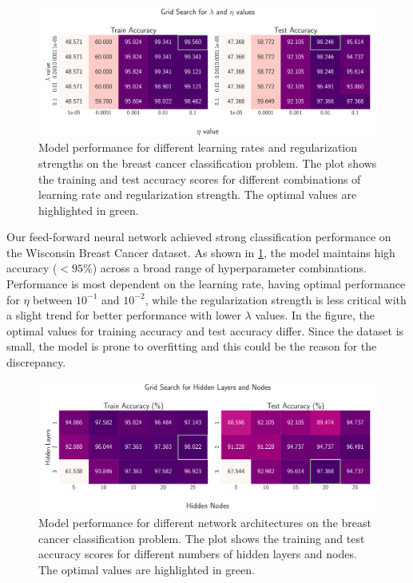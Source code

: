 \onecolumngrid
\begin{figure}[ht!]
    \centering
    \includegraphics[width = .9\textwidth]{../figs/classification_lambda_eta.pdf}
    \caption{Model performance for different learning rates and regularization strengths on the breast cancer classification problem. The plot shows the training and test accuracy scores for different combinations of learning rate and regularization strength. The optimal values are highlighted in green.}
    \label{fig:NN_Classification_lambda_eta}
\end{figure}
\twocolumngrid

Our feed-forward neural network achieved strong classification performance on the Wisconsin Breast Cancer dataset. As shown in \cref{fig:NN_Classification_lambda_eta}, the model maintains high accuracy ($<95\%$) across a broad range of hyperparameter combinations. Performance is most dependent on the learning rate, having optimal performance for $\eta$ between $10^{-1}$ and $10^{-2}$, while the regularization strength is less critical with a slight trend for better performance with lower $\lambda$ values. In the figure, the optimal values for training accuracy and test accuracy differ. Since the dataset is small, the model is prone to overfitting and this could be the reason for the discrepancy.

\onecolumngrid
\begin{figure}[ht!]
    \centering
    \includegraphics[width = .9\textwidth]{../figs/classification_hidden_layers_nodes.pdf}
    \caption{Model performance for different network architectures on the breast cancer classification problem. The plot shows the training and test accuracy scores for different numbers of hidden layers and nodes. The optimal values are highlighted in green.}
    \label{fig:NN_Classification_hidden_layers_nodes}
\end{figure}
\twocolumngrid

